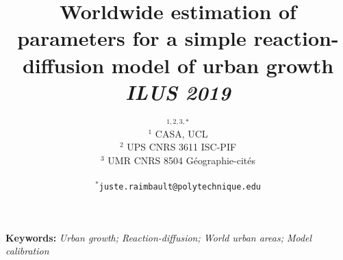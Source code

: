 \documentclass[11pt]{article}
\begin{document}
\title{\vspace{-1cm}Worldwide estimation of parameters for a simple reaction-diffusion model of urban growth
\\\medskip
\textit{ILUS 2019}
}
\author{$^{1,2,3,\ast}$\medskip\\
$^1$ CASA, UCL\\
$^2$ UPS CNRS 3611 ISC-PIF\\
$^3$ UMR CNRS 8504 G{\'e}ographie-cit{\'e}s\\
\medskip\\
$^{\ast}$\texttt{juste.raimbault@polytechnique.edu}
}
\date{}

\maketitle

\justify



\textbf{Keywords: }\textit{Urban growth; Reaction-diffusion; World urban areas; Model calibration}




\medskip
\end{document}
